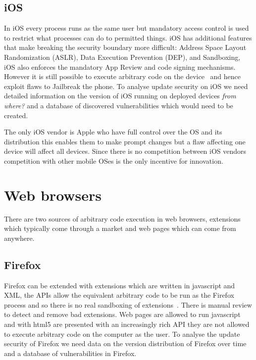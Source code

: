 \documentclass[12pt,a4paper]{article}
\begin{document}
\subsection{iOS}
In iOS every process runs as the same user but mandatory access control is used to restrict what processes can do to permitted things.
iOS has additional features that make breaking the security boundary more difficult: Address Space Layout Randomization (ASLR), Data Execution Prevention (DEP), and Sandboxing, iOS also enforces the mandatory App Review and code signing mechanisms.
However it is still possible to execute arbitrary code on the device~\cite{Wang2013a} and hence exploit flaws to Jailbreak the phone.
To analyse update security on iOS we need detailed information on the version of iOS running on deployed devices \emph{from where?} and a database of discovered vulnerabilities which would need to be created.

The only iOS vendor is Apple who have full control over the OS and its distribution this enables them to make prompt changes but a flaw affecting one device will affect all devices.
Since there is no competition between iOS vendors competition with other mobile OSes is the only incentive for innovation.

\section{Web browsers}
There are two sources of arbitrary code execution in web browsers, extensions which typically come through a market and web pages which can come from anywhere.

\subsection{Firefox}
Firefox can be extended with extensions which are written in javascript and XML, the APIs allow the equivalent arbitrary code to be run as the Firefox process and so there is no real sandboxing of extensions~\cite{Lerner2013}.
There is manual review to detect and remove bad extensions.
Web pages are allowed to run javascript and with html5 are presented with an increasingly rich API they are not allowed to execute arbitrary code on the computer as the user.
To analyse the update security of Firefox we need data on the version distribution of Firefox over time and a database of vulnerabilities in Firefox.
\end{document}
